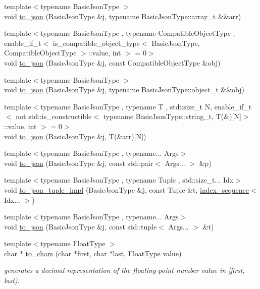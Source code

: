 \begin{DoxyCompactItemize}
\item 
{\footnotesize template$<$typename Basic\+Json\+Type $>$ }\\void \hyperlink{namespacenlohmann_1_1detail_aa0fd1b5788e9ba37e31da43dda738cb5}{to\+\_\+json} (Basic\+Json\+Type \&j, typename Basic\+Json\+Type\+::array\+\_\+t \&\&arr)
\item 
{\footnotesize template$<$typename Basic\+Json\+Type , typename Compatible\+Object\+Type , enable\+\_\+if\+\_\+t$<$ is\+\_\+compatible\+\_\+object\+\_\+type$<$ Basic\+Json\+Type, Compatible\+Object\+Type $>$\+::value, int $>$  = 0$>$ }\\void \hyperlink{namespacenlohmann_1_1detail_a24c9c12f3839c94e09532f08de85e949}{to\+\_\+json} (Basic\+Json\+Type \&j, const Compatible\+Object\+Type \&obj)
\item 
{\footnotesize template$<$typename Basic\+Json\+Type $>$ }\\void \hyperlink{namespacenlohmann_1_1detail_ac9f7a5542851c61d93740148eaec509f}{to\+\_\+json} (Basic\+Json\+Type \&j, typename Basic\+Json\+Type\+::object\+\_\+t \&\&obj)
\item 
{\footnotesize template$<$typename Basic\+Json\+Type , typename T , std\+::size\+\_\+t N, enable\+\_\+if\+\_\+t$<$ not std\+::is\+\_\+constructible$<$ typename Basic\+Json\+Type\+::string\+\_\+t, T(\&)\mbox{[}\+N\mbox{]}$>$\+::value, int $>$  = 0$>$ }\\void \hyperlink{namespacenlohmann_1_1detail_a8c4d301fc51996e3c5c1257fb92ace20}{to\+\_\+json} (Basic\+Json\+Type \&j, T(\&arr)\mbox{[}N\mbox{]})
\item 
{\footnotesize template$<$typename Basic\+Json\+Type , typename... Args$>$ }\\void \hyperlink{namespacenlohmann_1_1detail_aa30611f74062379d3420c40487cf3bb3}{to\+\_\+json} (Basic\+Json\+Type \&j, const std\+::pair$<$ Args... $>$ \&p)
\item 
{\footnotesize template$<$typename Basic\+Json\+Type , typename Tuple , std\+::size\+\_\+t... Idx$>$ }\\void \hyperlink{namespacenlohmann_1_1detail_a510dfa15b01e9a8afe31600a27b28199}{to\+\_\+json\+\_\+tuple\+\_\+impl} (Basic\+Json\+Type \&j, const Tuple \&t, \hyperlink{structnlohmann_1_1detail_1_1index__sequence}{index\+\_\+sequence}$<$ Idx... $>$)
\item 
{\footnotesize template$<$typename Basic\+Json\+Type , typename... Args$>$ }\\void \hyperlink{namespacenlohmann_1_1detail_aa7a47b08eee864c2c108c04954919648}{to\+\_\+json} (Basic\+Json\+Type \&j, const std\+::tuple$<$ Args... $>$ \&t)
\item 
{\footnotesize template$<$typename Float\+Type $>$ }\\char $\ast$ \hyperlink{namespacenlohmann_1_1detail_a6192f1eab05fbbc5c35edb8368c8fc57}{to\+\_\+chars} (char $\ast$first, char $\ast$last, Float\+Type value)
\begin{DoxyCompactList}\small\item\em generates a decimal representation of the floating-\/point number value in \mbox{[}first, last). \end{DoxyCompactList}\end{DoxyCompactItemize}


